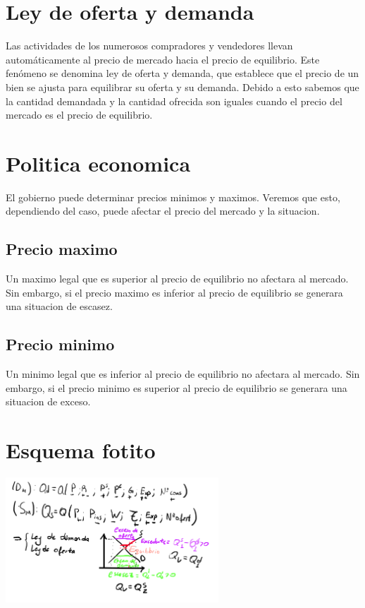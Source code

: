 \documentclass{report}
\begin{document}
\section{Ley de oferta y demanda}

Las actividades de los numerosos compradores y vendedores llevan automáticamente al precio de mercado hacia el precio de equilibrio. Este fenómeno se denomina ley de oferta y demanda, que establece que el precio de un bien se ajusta para equilibrar su oferta y su demanda. 
Debido a esto sabemos que la cantidad demandada y la cantidad ofrecida son iguales cuando el precio del mercado es el precio de equilibrio.

\section{Politica economica}

El gobierno puede determinar precios minimos y maximos. Veremos que esto, dependiendo del caso, puede afectar el precio del mercado y la situacion.

\subsection{Precio maximo}
Un maximo legal que es superior al precio de equilibrio no afectara al mercado.
Sin embargo, si el precio maximo es inferior al precio de equilibrio se generara una situacion de escasez.

\subsection{Precio minimo}
Un minimo legal que es inferior al precio de equilibrio no afectara al mercado.
Sin embargo, si el precio minimo es superior al precio de equilibrio se generara una situacion de exceso.

\section{Esquema fotito}

\includegraphics[width=8cm]{../Assets/ley_oferta_demanda.png}
\end{document}
